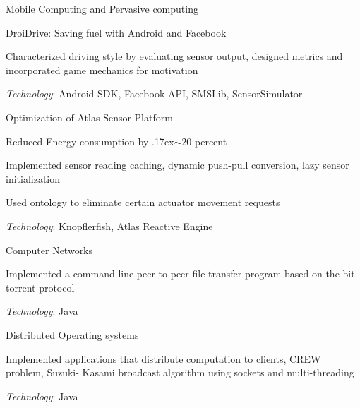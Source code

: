\documentclass[10pt]{article}
\renewcommand\textit[1]{#1}
\newenvironment{outerlist}[1][\enskip\textbullet]%
        {\begin{itemize}[#1]}{\end{itemize}%
         \vspace{-.6\baselineskip}}
\newenvironment{innerlist}[1][\enskip\textbullet]%
        {\begin{compactitem}[#1]}{\end{compactitem}}
\newcommand{\halfblankline}{\quad\vspace{-0.5\baselineskip}\pagebreak[3]}
\begin{document}
\begin{outerlist}
\begin{innerlist}
        \item[] \textit{Mobile Computing and Pervasive computing}%
        \begin{innerlist}
        \item DroiDrive: Saving fuel with Android and Facebook
        \begin{innerlist}
            \item Characterized driving style by evaluating sensor output, designed metrics and incorporated game mechanics for motivation
	   \item \textsl{Technology}: Android SDK, Facebook API, SMSLib, SensorSimulator
        \end{innerlist}
        \halfblankline
              \item Optimization of Atlas Sensor Platform
        \begin{innerlist}
            \item Reduced Energy consumption by {\raise.17ex\hbox{$\scriptstyle\mathtt{\sim}$}}20 percent
            \item Implemented sensor reading caching, dynamic push-pull conversion, lazy sensor initialization
            \item Used ontology to eliminate certain actuator movement requests
            \item \textsl{Technology}: Knopflerfish, Atlas Reactive Engine
        \end{innerlist}
      \end{innerlist}
        \halfblankline

                \item[] Computer Networks
        \begin{innerlist}
            \item Implemented a command line peer to peer file transfer program based on the bit torrent protocol
            \item \textsl{Technology}: Java
        \end{innerlist}

        \halfblankline

        \item[] Distributed Operating systems
        \begin{innerlist}
            \item Implemented applications that distribute computation to clients, CREW problem, Suzuki- Kasami broadcast algorithm using sockets and multi-threading
            \item \textsl{Technology}: Java
        \end{innerlist}


\end{innerlist}
\end{outerlist}
\end{document}

